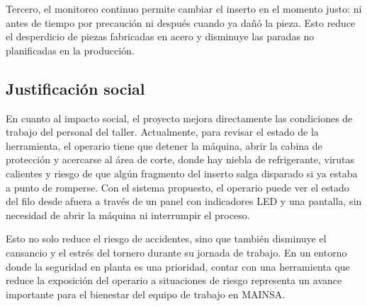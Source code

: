 Tercero, el monitoreo continuo permite cambiar el inserto en el momento justo: ni antes de tiempo por precaución ni después cuando ya dañó la pieza. Esto reduce el desperdicio de piezas fabricadas en acero y disminuye las paradas no planificadas en la producción.

\subsection{Justificación social}
En cuanto al impacto social, el proyecto mejora directamente las condiciones de trabajo del personal del taller. Actualmente, para revisar el estado de la herramienta, el operario tiene que detener la máquina, abrir la cabina de protección y acercarse al área de corte, donde hay niebla de refrigerante, virutas calientes y riesgo de que algún fragmento del inserto salga disparado si ya estaba a punto de romperse. Con el sistema propuesto, el operario puede ver el estado del filo desde afuera a través de un panel con indicadores LED y una pantalla, sin necesidad de abrir la máquina ni interrumpir el proceso.

Esto no solo reduce el riesgo de accidentes, sino que también disminuye el cansancio y el estrés del tornero durante su jornada de trabajo. En un entorno donde la seguridad en planta es una prioridad, contar con una herramienta que reduce la exposición del operario a situaciones de riesgo representa un avance importante para el bienestar del equipo de trabajo en MAINSA.
